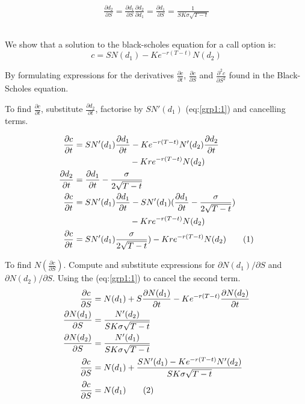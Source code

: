 \documentclass{sig-alternate-05-2015}
\newcommand\numberthis{\addtocounter{equation}{1}\tag{\theequation}}
\begin{document}
\begin{align}
\frac{\partial d_2}{\partial S} = \frac{\partial d_1}{\partial S} \frac{\partial d_2}{\partial d_1} = \frac{\partial d_1}{\partial S} = \frac{1}{SK\sigma\sqrt{T-t}}
\end{align}

\subsection{}
We show that a solution to the black-scholes equation for a call option is:
\begin{equation} \label{call_equation}
c = SN(d_1) - Ke^{-r(T-t)}N(d_2)
\end{equation}

By formulating expressions for the derivatives $\frac{\partial c}{\partial t}$, $\frac{\partial c}{\partial S}$ and $\frac{\partial^2 c}{\partial S^2}$ found in the Black-Scholes equation. 

To find $\frac{\partial c}{\partial t}$, substitute $\frac{\partial d_2}{\partial t}$, factorise by $SN'(d_1)$ (eq:\ref{grp1:1}) and cancelling terms.


\begin{align*}
\frac{\partial c}{\partial t} &= SN'(d_1)\frac{\partial d_1}{\partial t} - Ke^{-r(T-t)}N'(d_2)\frac{\partial d_2}{\partial t}\\
 &\qquad \qquad \qquad \ \ - Kre^{-r(T-t)}N(d_2) \\
\frac{\partial d_2}{\partial t} 
&= \frac{\partial d_1}{\partial t} -\frac{\sigma}{2\sqrt{T-t}} \\
\frac{\partial c}{\partial t} &= SN'(d_1)\frac{\partial d_1}{\partial t} - SN'(d_1)(\frac{\partial d_1}{\partial t} - \frac{\sigma}{2\sqrt{T-t}})\\
 &\qquad \qquad \qquad \ \ - Kre^{-r(T-t)}N(d_2) \\
\frac{\partial c}{\partial t} &= SN'(d_1)\frac{\sigma}{2\sqrt{T-t}}) - Kre^{-r(T-t)}N(d_2) \numberthis
\end{align*}

To find $N(\frac{\partial c}{\partial S})$. Compute and substitute expressions for $\partial N(d_1)/\partial S$ and $\partial N(d_2)/\partial S$. Using the (eq:\ref{grp1:1}) to cancel the second term. 
\begin{align*}
\frac{\partial c}{\partial S} &= N(d_1) +S\frac{\partial N(d_1)}{\partial t} - Ke^{-r(T-t)}\frac{\partial N(d_2)}{\partial t} \\
\frac{\partial N(d_1)}{\partial S} &= \frac{N'(d_2)}{SK\sigma\sqrt{T-t}} \\ 
\frac{\partial N(d_2)}{\partial S} &= \frac{N'(d_1)}{SK\sigma\sqrt{T-t}} \\
\frac{\partial c}{\partial S} &= N(d_1) + \frac{SN'(d_1) - Ke^{-r(T-t)}N'(d_2)}{SK\sigma\sqrt{T-t}} \\ 
\frac{\partial c}{\partial S} &= N(d_1) \numberthis
\end{align*}
\end{document}
